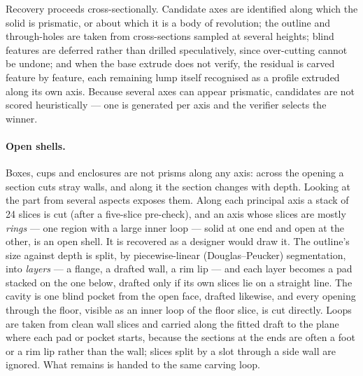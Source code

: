 \documentclass[11pt]{article}
\begin{document}
Recovery proceeds cross-sectionally. Candidate axes are identified along which
the solid is prismatic, or about which it is a body of revolution; the outline
and through-holes are taken from cross-sections sampled at several heights;
blind features are deferred rather than drilled speculatively, since
over-cutting cannot be undone; and when the base extrude does not verify, the
residual is carved feature by feature, each remaining lump itself recognised as
a profile extruded along its own axis. Because several axes can appear
prismatic, candidates are not scored heuristically --- one is generated per axis
and the verifier selects the winner.

\paragraph{Open shells.} Boxes, cups and enclosures are not prisms along any
axis: across the opening a section cuts stray walls, and along it the section
changes with depth. Looking at the part from several aspects exposes them.
Along each principal axis a stack of 24 slices is cut (after a five-slice
pre-check), and an axis whose slices are mostly \emph{rings} --- one region with
a large inner loop --- solid at one end and open at the other, is an open shell.
It is recovered as a designer would draw it. The outline's size against depth is
split, by piecewise-linear (Douglas--Peucker) segmentation, into \emph{layers}
--- a flange, a drafted wall, a rim lip --- and each layer becomes a pad stacked
on the one below, drafted only if its own slices lie on a straight line. The
cavity is one blind pocket from the open face, drafted likewise, and every
opening through the floor, visible as an inner loop of the floor slice, is cut
directly. Loops are taken from clean wall slices and carried along the fitted
draft to the plane where each pad or pocket starts, because the sections at the
ends are often a foot or a rim lip rather than the wall; slices split by a slot
through a side wall are ignored. What remains is handed to the same carving
loop.
\end{document}
